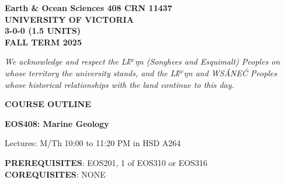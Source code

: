 \documentclass[11pt]{article}
\def\schwa{{\tenipa\char64}}
\begin{document}


%


\hspace*{\fill}\textbf{Earth \& Ocean Sciences 408 CRN 11437}\\
\hspace*{\fill}\textbf{UNIVERSITY OF VICTORIA}\\
\hspace*{\fill}\textbf{3-0-0 (1.5 UNITS)}\\
\hspace*{\fill}\textbf{FALL TERM 2025}\\


\noindent\hrulefill

\begin{center}
\emph{We acknowledge and respect the L\schwa\'k$^w$\schwa ŋ\schwa n (Songhees and Esquimalt) Peoples on whose territory the university stands, and the L\schwa\'k$^w$\schwa ŋ\schwa n and WS\'ANE\'C Peoples whose historical relationships with the land continue to this day.}
\end{center}

\noindent\hrulefill

\begin{center}
\Large \textbf{COURSE OUTLINE}

\Large \textbf{EOS408: Marine Geology}

\normalsize Lectures: M/Th 10:00 to 11:20 PM in HSD A264 \\
\end{center}

\noindent\hrulefill

\textbf{PREREQUISITES}: EOS201, 1 of EOS310 or EOS316\\
\textbf{COREQUISITES}: NONE\\
\end{document}
